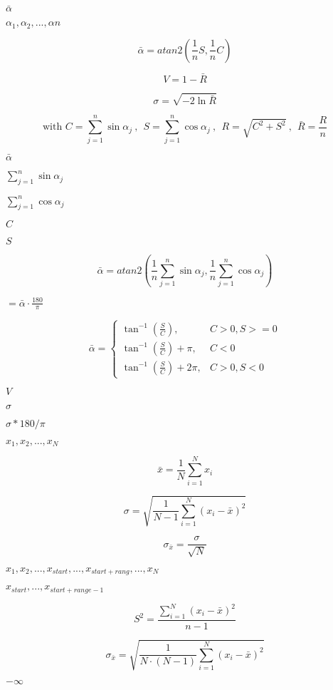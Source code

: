 \documentclass{article}
\begin{document}
$
\bar{\alpha} $
\pagebreak

$ \alpha_{1}, \alpha_{2}, ..., \alpha{n} $
\pagebreak

\[ \bar{\alpha} = atan2\left( \frac{1}{n} S, \frac{1}{n} C \right) \]
\pagebreak

\[ V = 1 - \bar{R} \]
\pagebreak

\[ \sigma = \sqrt{ - 2 \ln{ \bar{R} } } \]
\pagebreak

\[ \mbox{with } C = \sum_{j=1}^{n}{\sin{\alpha_{j}}} \ , \ \ S = \sum_{j=1}^{n}{\cos{\alpha_{j}}} \ , \ \ R =
\sqrt{ C^2 + S^2 } \ , \ \ \bar{R} = \frac{R}{n} \]
\pagebreak

$ \bar{\alpha} $
\pagebreak

$ \sum_{j=1}^{n}{\sin{\alpha_{j}}} $
\pagebreak

$ \sum_{j=1}^{n}{\cos{\alpha_{j}}} $
\pagebreak

$ C $
\pagebreak

$ S $
\pagebreak

\[
 \bar{\alpha} = atan2\left( \frac{1}{n} \sum_{j=1}^{n}{\sin{\alpha_{j}}}, \frac{1}{n}
\sum_{j=1}^{n}{\cos{\alpha_{j}}} \right) \]
\pagebreak

$ = \bar{\alpha} \cdot \frac{180}{\pi} $
\pagebreak

\[

\bar{\alpha}=\left\{\begin{array}{ll}\tan^{-1}{ ( \frac{S}{C} ) }, & C > 0, S >= 0 \\
 \tan^{-1}{ ( \frac{S}{C} ) } + \pi   ,& C < 0  \\
              \tan^{-1}{ ( \frac{S}{C} ) } + 2 \pi ,& C > 0, S < 0
              \end{array}\right.
\]
\pagebreak

$V$
\pagebreak

$ \sigma $
\pagebreak

$ \sigma * 180 / \pi $
\pagebreak

$ x_{1}, x_{2}, ..., x_{N} $
\pagebreak

\[ \bar{x} = \frac{1}{N} \sum_{i=1}^{N}{ x_{i} }  \]
\pagebreak

\[ \sigma = \sqrt{ \frac{1}{N-1} \sum_{i=1}^{N}{(x_{i} - \bar{x} )^2} }  \]
\pagebreak

\[ \sigma_{\bar{x}} = \frac{\sigma}{\sqrt{N}}  \]
\pagebreak

$ x_{1}, x_{2}, ..., x_{start}, ..., x_{start + rang}, ..., x_{N} $
\pagebreak

$ x_{start}, ..., x_{start + range - 1} $
\pagebreak

\[ S^2 = \frac{\sum_{i=1}^{N}{ (x_{i} - \bar{x})^2}}{n - 1} \]
\pagebreak

\[ \sigma_{\bar{x}} = \sqrt{ \frac{1}{N\cdot(N-1)}\sum_{i=1}^{N}{(x_{i} - \bar{x} )^2} }  \]
\pagebreak

$-\infty$
\pagebreak
\end{document}

